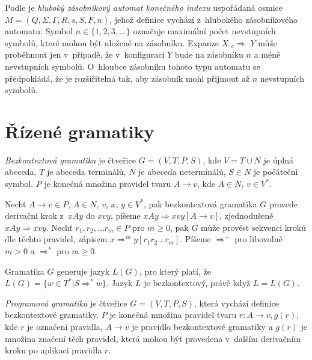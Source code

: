 
\begin{Def} Podle \cite{Meduna:FinitelyDeepPDA} je \emph{hluboký zásobníkový automat konečného indexu} uspořádaná osmice $M = (Q,\Sigma,\Gamma, R, s, S, F, n)$, jehož definice vychází z~hlubokého zásobníkového automatu. Symbol $n \in \{1,2,3,\dots\}$ označuje maximální počet nevstupních symbolů, které mohou být uložené na zásobníku. Expanze $X$  ${}_e{\Rightarrow}$  $Y$ může proběhnout jen v~případě, že v~konfiguraci $Y$ bude na zásobníku $n$ a méně nevstupních symbolů.  O~hloubce zásobníku tohoto typu automatu se předpokládá, že je rozšiřitelná tak, aby zásobník mohl přijmout až $n$ nevstupních symbolů.



\end{Def}


\section{Řízené gramatiky}

\begin{Def}\label{def_bezkontext_gram}

\emph{Bezkontextová gramatika} \cite{Krivka:RewritingSystems} je čtveřice $G = (V,T,P,S)$, kde $V = T \cup N$ je úplná abeceda, $T$ je abeceda terminálů, $N$ je abeceda neterminálů, $S \in N$ je počáteční symbol. $P$ je konečná množina pravidel tvaru $A \rightarrow v$, kde $A \in N$, $v \in V^*$.

Nechť $A \rightarrow v \in P$, $A \in N$, $v$, $x$, $y \in V^*$, pak bezkontextová gramatika $G$ provede derivační krok z~$xAy$ do $xvy$, píšeme $xAy \Rightarrow xvy [A \rightarrow v]$, zjednodušeně $xAy \Rightarrow xvy$. 
Nechť $r_1, r_2, \dots r_m \in P$ pro $m \ge 0$, pak $G$ může provést sekvenci kroků dle těchto pravidel, zápisem $x {\Rightarrow}^m y [r_1 r_2 \dots r_m]$. Píšeme ${\Rightarrow}^+$ pro libovolné $m > 0$ a ${\Rightarrow}^*$ pro $m \ge 0$. 

Gramatika $G$ generuje jazyk $L(G)$, pro který platí, že $L(G) = \{w \in T^* | S {\Rightarrow}^* w\}$. Jazyk $L$ je bezkontextový, právě když $L = L(G)$.

\end{Def}

\begin{Def}
\emph{Programová gramatika} \cite{Krivka:RewritingSystems} je čtveřice $G = (V,T,P,S)$, která vychází definice bezkontextové gramatiky. $P$ je konečná množina pravidel tvaru $r \colon A \rightarrow v, g(r)$, kde $r$ je označení pravidla, $A \rightarrow v$ je pravidlo bezkontextové gramatiky a $g(r)$ je množina značení těch pravidel, která mohou být provedena v~dalším derivačním kroku po aplikaci pravidla $r$.
\end{Def}

